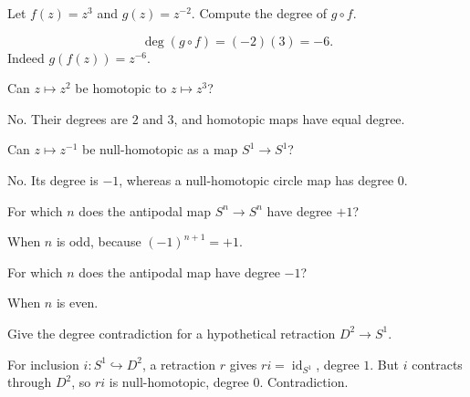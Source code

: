 \begin{problem}[Composition]\label{prob:viii03-03}
Let \(f(z)=z^3\) and \(g(z)=z^{-2}\).  Compute the degree of \(g\circ f\).
\end{problem}
\begin{solution}
\[
\deg(g\circ f)=(-2)(3)=-6.
\]
Indeed \(g(f(z))=z^{-6}\).
\end{solution}

\begin{problem}\label{prob:viii03-04}
Can \(z\mapsto z^2\) be homotopic to \(z\mapsto z^3\)?
\end{problem}
\begin{solution}
No.  Their degrees are \(2\) and \(3\), and homotopic maps have equal degree.
\end{solution}

\begin{problem}\label{prob:viii03-05}
Can \(z\mapsto z^{-1}\) be null-homotopic as a map \(S^1\to S^1\)?
\end{problem}
\begin{solution}
No.  Its degree is \(-1\), whereas a null-homotopic circle map has degree \(0\).
\end{solution}

\begin{problem}\label{prob:viii03-06}
For which \(n\) does the antipodal map \(S^n\to S^n\) have degree \(+1\)?
\end{problem}
\begin{solution}
When \(n\) is odd, because \((-1)^{n+1}=+1\).
\end{solution}

\begin{problem}\label{prob:viii03-07}
For which \(n\) does the antipodal map have degree \(-1\)?
\end{problem}
\begin{solution}
When \(n\) is even.
\end{solution}

\begin{problem}[No retraction]\label{prob:viii03-08}
Give the degree contradiction for a hypothetical retraction
\(D^2\to S^1\).
\end{problem}
\begin{solution}
For inclusion \(i:S^1\hookrightarrow D^2\), a retraction \(r\) gives
\(ri=\operatorname{id}_{S^1}\), degree \(1\).  But \(i\) contracts through
\(D^2\), so \(ri\) is null-homotopic, degree \(0\).  Contradiction.
\end{solution}

